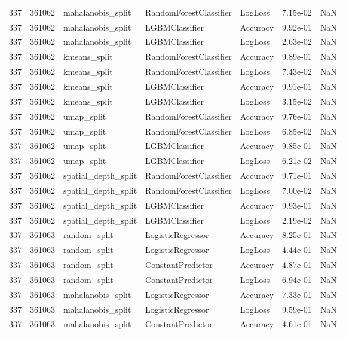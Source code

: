 \begin{tabular}{rrlllrr}
337 & 361062 & mahalanobis\_split & RandomForestClassifier & LogLoss & 7.15e-02 & NaN \\
337 & 361062 & mahalanobis\_split & LGBMClassifier & Accuracy & 9.92e-01 & NaN \\
337 & 361062 & mahalanobis\_split & LGBMClassifier & LogLoss & 2.63e-02 & NaN \\
337 & 361062 & kmeans\_split & RandomForestClassifier & Accuracy & 9.89e-01 & NaN \\
337 & 361062 & kmeans\_split & RandomForestClassifier & LogLoss & 7.43e-02 & NaN \\
337 & 361062 & kmeans\_split & LGBMClassifier & Accuracy & 9.91e-01 & NaN \\
337 & 361062 & kmeans\_split & LGBMClassifier & LogLoss & 3.15e-02 & NaN \\
337 & 361062 & umap\_split & RandomForestClassifier & Accuracy & 9.76e-01 & NaN \\
337 & 361062 & umap\_split & RandomForestClassifier & LogLoss & 6.85e-02 & NaN \\
337 & 361062 & umap\_split & LGBMClassifier & Accuracy & 9.85e-01 & NaN \\
337 & 361062 & umap\_split & LGBMClassifier & LogLoss & 6.21e-02 & NaN \\
337 & 361062 & spatial\_depth\_split & RandomForestClassifier & Accuracy & 9.71e-01 & NaN \\
337 & 361062 & spatial\_depth\_split & RandomForestClassifier & LogLoss & 7.00e-02 & NaN \\
337 & 361062 & spatial\_depth\_split & LGBMClassifier & Accuracy & 9.93e-01 & NaN \\
337 & 361062 & spatial\_depth\_split & LGBMClassifier & LogLoss & 2.19e-02 & NaN \\
337 & 361063 & random\_split & LogisticRegressor & Accuracy & 8.25e-01 & NaN \\
337 & 361063 & random\_split & LogisticRegressor & LogLoss & 4.44e-01 & NaN \\
337 & 361063 & random\_split & ConstantPredictor & Accuracy & 4.87e-01 & NaN \\
337 & 361063 & random\_split & ConstantPredictor & LogLoss & 6.94e-01 & NaN \\
337 & 361063 & mahalanobis\_split & LogisticRegressor & Accuracy & 7.33e-01 & NaN \\
337 & 361063 & mahalanobis\_split & LogisticRegressor & LogLoss & 9.59e-01 & NaN \\
337 & 361063 & mahalanobis\_split & ConstantPredictor & Accuracy & 4.61e-01 & NaN \\

\end{tabular}
